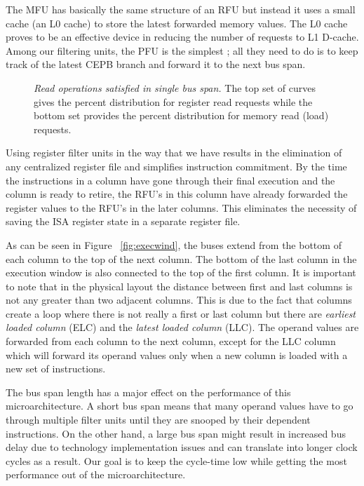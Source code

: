 \documentclass[10pt,twocolumn]{IEEEtran}
\begin{document}
The MFU has basically the same structure of an RFU but instead
it uses a small
cache (an L0 cache) to store the latest forwarded memory values.
The L0 cache proves to be an effective device in reducing the number of
requests to L1 D-cache.
Among our f{il}tering units, the PFU
is the simplest ; all they need to do is to keep track of the
latest CEPB branch and forward it to the next bus span.
%
\begin{figure}
\caption{{\em Read operations satisfied in single bus span.}
The top set of curves gives the percent distribution for
register read requests while the bottom set provides the
percent distribution for memory read (load) requests.}
\label{fig:busspan}
\end{figure}
%
Using register f{il}ter units in the way that we have
results in the elimination of any centralized
register f{il}e and simplifies instruction commitment.  By the time
the instructions in a column have gone through their f{in}al execution
and the column is ready to retire, the RFU's in this column have
already forwarded the register values to the RFU's in the later
columns.  This eliminates the necessity of saving the ISA register
state in a separate register f{il}e.

As can be seen in Figure ~\ref{fig:execwind}, the buses extend from the
bottom of each column to the top of the next column.  
The bottom of the last column in the execution window is also 
connected to the top of the f{ir}st column.  It is important to note
that in the physical layout the distance between f{ir}st and last columns 
is not any greater than two adjacent columns.  This is due to the 
fact that columns create a loop where there is not really a
f{ir}st or last column but there are \emph{earliest loaded column} (ELC)
and the \emph{latest loaded column} (LLC).  The operand values are
forwarded from each column to the next column, except for the LLC
column which will forward its operand values only when a new column
is loaded with a new set of instructions.

The bus span length has a major effect on the
performance of this microarchitecture.
A short bus span means that many operand values
have to go through multiple f{il}ter units until they are
snooped by their dependent instructions.  On the other hand,
a large bus span might result in increased bus delay due to technology
implementation issues and can
translate into longer clock cycles as a result.  
Our goal is to keep the
cycle-time low while getting the most performance out of 
the microarchitecture.
\end{document}
